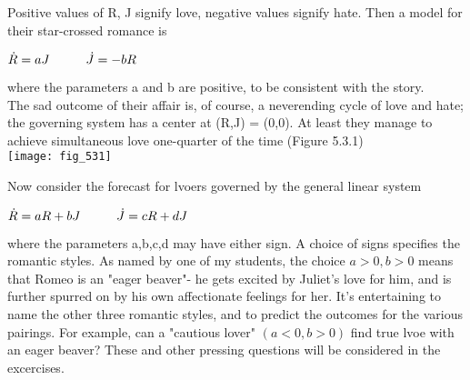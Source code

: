 \documentclass{article}
\newcommand\tab[1][1cm]{\hspace*{#1}}
\begin{document}
Positive values of R, J signify love, negative values signify hate. Then a model for their star-crossed romance is
\begin{center}
$\dot{R}=aJ \tab
\dot{J}=-bR$
\end{center}

where the parameters a and b are positive, to be consistent with the story. \\ \tab
The sad outcome of their affair is, of course, a neverending cycle of love and hate; the governing system has a center at (R,J) = (0,0). At least they manage to achieve simultaneous love one-quarter of the time (Figure 5.3.1) \\

\texttt{[image: fig\_531]}

Now consider the forecast for lvoers governed by the general linear system
\begin{center}
$\dot{R}=aR + bJ \tab \dot{J}=cR + dJ$
\end{center}

where the parameters a,b,c,d may have either sign. A choice of signs specifies the romantic styles. As named by one of my students, the choice $a>0, b>0$ means that Romeo is an "eager beaver"- he gets excited by Juliet's love for him, and is further spurred on by his own affectionate feelings for her. It's entertaining to name the other three romantic styles, and to predict the outcomes for the various pairings. For example, can a "cautious lover" $(a<0, b>0)$ find true lvoe with an eager beaver? These and other pressing questions will be considered in the excercises.
\end{document}
